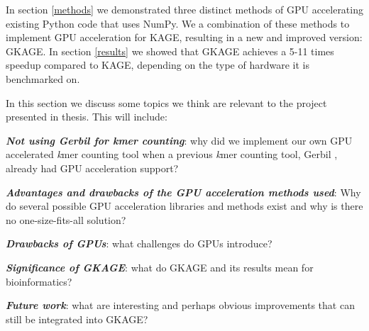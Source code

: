 In section \ref{methods} we demonstrated three distinct methods of GPU accelerating existing Python code that uses NumPy.
We a combination of these methods to implement GPU acceleration for KAGE, resulting in a new and improved version: GKAGE.
In section \ref{results} we showed that GKAGE achieves a 5-11 times speedup compared to KAGE, depending on the type of hardware it is benchmarked on.

In this section we discuss some topics we think are relevant to the project presented in thesis.
This will include:
\begin{compactitem}
  \item
    \textit{\textbf{Not using Gerbil for kmer counting}}: why did we implement our own GPU accelerated \textit{k}mer counting tool when a previous \textit{k}mer counting tool, Gerbil \cite{gerbil}, already had GPU acceleration support?
  \item
    \textit{\textbf{Advantages and drawbacks of the GPU acceleration methods used}}: Why do several possible GPU acceleration libraries and methods exist and why is there no one-size-fits-all solution?
  \item
    \textit{\textbf{Drawbacks of GPUs}}: what challenges do GPUs introduce?
  \item
    \textit{\textbf{Significance of GKAGE}}: what do GKAGE and its results mean for bioinformatics?
  \item
    \textit{\textbf{Future work}}: what are interesting and perhaps obvious improvements that can still be integrated into GKAGE?
\end{compactitem}
